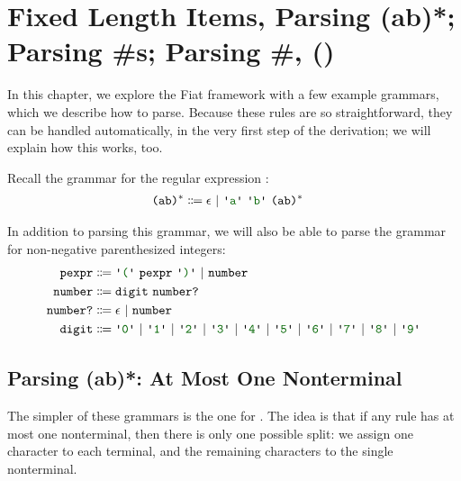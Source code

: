 \chapter{Fixed Length Items, Parsing (ab)*; Parsing \#s; Parsing \#, ()}
  In this chapter, we explore the Fiat framework with a few example grammars, which we describe how to parse.  Because these rules are so straightforward, they can be handled automatically, in the very first step of the derivation; we will explain how this works, too.
  
  Recall the grammar for the regular expression :
  \begin{align*}
    \nt{(ab)$^*$} & \Coloneqq \nt{$\epsilon$}~|~\terminal{a}~\terminal{b}~\nt{(ab)$^*$}
  \end{align*}
  
  In addition to parsing this grammar, we will also be able to parse the grammar for non-negative parenthesized integers:
  \begin{align*}
    \nt{pexpr} & \Coloneqq \terminal{(}~\nt{pexpr}~\terminal{)}~|~\nt{number} \\
    \nt{number} & \Coloneqq \nt{digit}~\nt{number?} \\
    \nt{number?} & \Coloneqq \epsilon~|~\nt{number} \\
    \nt{digit} & \Coloneqq \terminal{0}~|~\terminal{1}~|~\terminal{2}~|~\terminal{3}~|~\terminal{4}~|~\terminal{5}~|~\terminal{6}~|~\terminal{7}~|~\terminal{8}~|~\terminal{9}
  \end{align*}
    
  \section{Parsing (ab)*: At Most One Nonterminal}
    The simpler of these grammars is the one for .  The idea is that if any rule has at most one nonterminal, then there is only one possible split: we assign one character to each terminal, and the remaining characters to the single nonterminal.
    
